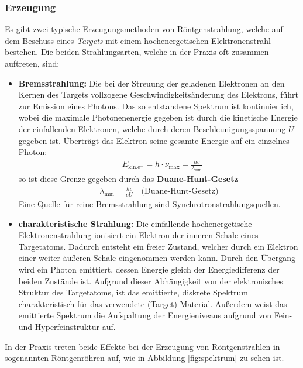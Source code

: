 \documentclass[11pt, a4paper]{article}
\begin{document}
\subsubsection{Erzeugung}
\label{sec:röntgenerzeugung}
Es gibt zwei typische Erzeugungsmethoden von Röntgenstrahlung, welche auf dem Beschuss eines \emph{Targets} mit einem hochenergetischen Elektronenstrahl bestehen.
Die beiden Strahlungsarten, welche in der Praxis oft zusammen auftreten, sind:
\begin{itemize}
  \item \textbf{Bremsstrahlung:} Die bei der Streuung der geladenen Elektronen an den Kernen des Targets vollzogene Geschwindigkeitsänderung des Elektrons, führt zur Emission eines Photons.
  Das so entstandene Spektrum ist kontinuierlich, wobei die maximale Photonenenergie gegeben ist durch die kinetische Energie der einfallenden Elektronen, welche durch deren Beschleunigungsspannung $U$ gegeben ist.
  Überträgt das Elektron seine gesamte Energie auf ein einzelnes Photon:
  \begin{align}
    &E_\mathrm{kin. e^-} = h \cdot \nu_\mathrm{max} = \frac{hc}{\lambda_\mathrm{min}}
  \end{align}
  so ist diese Grenze gegeben durch das \textbf{Duane-Hunt-Gesetz}
  \begin{align}
    \lambda_\mathrm{min} = \frac{h c}{e U} \quad \text{(Duane-Hunt-Gesetz)}
  \end{align}
  Eine Quelle für reine Bremsstrahlung sind Synchrotronstrahlungsquellen.

  \item \textbf{charakteristische Strahlung:} Die einfallende hochenergetische Elektronenstrahlung ionisiert ein Elektron der inneren Schale eines Targetatoms.
  Dadurch entsteht ein freier Zustand, welcher durch ein Elektron einer weiter äußeren Schale eingenommen werden kann.
  Durch den Übergang wird ein Photon emittiert, dessen Energie gleich der Energiedifferenz der beiden Zustände ist.
  Aufgrund dieser Abhängigkeit von der elektronisches Struktur des Targetatoms, ist das emittierte, diskrete Spektrum charakteristisch für das verwendete (Target)-Material.
  Außerdem weist das emittierte Spektrum die Aufspaltung der Energieniveaus aufgrund von Fein- und Hyperfeinstruktur auf.
\end{itemize}
In der Praxis treten beide Effekte bei der Erzeugung von Röntgenstrahlen in sogenannten Röntgenröhren auf, wie in Abbildung \ref{fig:spektrum} zu sehen ist.
\end{document}
